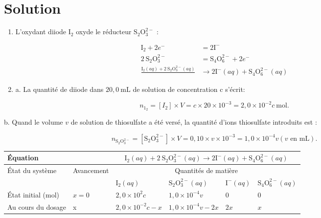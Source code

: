 \section*{Solution}
\begin{enumerate}
  \item L'oxydant diiode $\mathrm{I}_{2}$ oxyde le réducteur $\mathrm{S}_{2} \mathrm{O}_{3}^{2-}$ :
\end{enumerate}

$$
\begin{aligned}
\mathrm{I}_{2}+2 e^{-} & =2 \mathrm{I}^{-} \\
2 \mathrm{~S}_{2} \mathrm{O}_{3}^{2-} & =\mathrm{S}_{4} \mathrm{O}_{6}^{2-}+2 e^{-} \\
\frac{\mathrm{I}_{2}(a q)+2 \mathrm{~S}_{2} \mathrm{O}_{3}^{2-}(a q)}{} & \rightarrow 2 \mathrm{I}^{-}(a q)+\mathrm{S}_{4} \mathrm{O}_{6}^{2-}(a q)
\end{aligned}
$$

\begin{enumerate}
  \setcounter{enumi}{1}
  \item a. La quantité de diiode dans $20,0 \mathrm{~mL}$ de solution de concentration c s'écrit:
\end{enumerate}

$$
n_{1_{2}}=\left[I_{2}\right] \times V=c \times 20 \times 10^{-3}=2,0 \times 10^{-2} c \mathrm{~mol} .
$$

b. Quand le volume $v$ de solution de thiosulfate a été versé, la quantité d'ions thiosulfate introduits est :

$$
n_{\mathrm{S}_{2} \mathrm{O}_{3}^{2-}}=\left[\mathrm{S}_{2} \mathrm{O}_{3}^{2-}\right] \times V=0,10 \times v \times 10^{-3}=1,0 \times 10^{-4} v(v \text { en } \mathrm{mL}) .
$$

\begin{center}
\begin{tabular}{|l|l|l|l|l|l|}
\hline
\multicolumn{2}{|l|}{Équation} & \multicolumn{4}{|c|}{$\mathrm{I}_{2}(a q)+2 \mathrm{~S}_{2} \mathrm{O}_{3}^{2-}(a q) \rightarrow 2 \mathrm{I}^{-}(a q)+\mathrm{S}_{4} \mathrm{O}_{6}^{2-}(a q)$} \\
\hline
\multirow{2}{*}{État du système} & \multirow{2}{*}{Avancement} & \multicolumn{4}{|c|}{Quantités de matière} \\
\hline
 &  & $\mathrm{I}_{2}(a q)$ & $\mathrm{S}_{2} \mathrm{O}_{3}^{2-}(a q)$ & $\mathrm{I}^{-}(a q)$ & $\mathrm{S}_{4} \mathrm{O}_{6}^{2-}(a q)$ \\
\hline
État initial (mol) & $x=0$ & $2,0 \times 10^{2} c$ & $1,0 \times 10^{-4} v$ & 0 & 0 \\
\hline
Au cours du dosage & x & $2,0 \times 10^{-2} c-x$ & $1,0 \times 10^{-4} v-2 x$ & $2 x$ & $x$ \\
\hline
\end{tabular}
\end{center}

